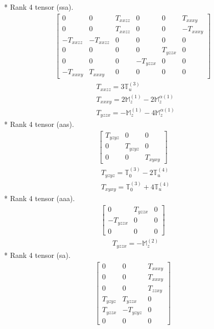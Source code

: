 \documentclass[fleqn,8pt,landscape]{jsarticle}
\begin{document}
* Rank 4 tensor (ssa).
\begin{align*}
\begin{bmatrix} 0 & 0 & T_{xxzz} & 0 & 0 & T_{xxxy} \\ 0 & 0 & T_{xxzz} & 0 & 0 & - T_{xxxy} \\ - T_{xxzz} & - T_{xxzz} & 0 & 0 & 0 & 0 \\ 0 & 0 & 0 & 0 & T_{yzzx} & 0 \\ 0 & 0 & 0 & - T_{yzzx} & 0 & 0 \\ - T_{xxxy} & T_{xxxy} & 0 & 0 & 0 & 0 \end{bmatrix}
\end{align*}
\begin{align*}
& T_{xxzz} = 3 \mathbb{T}_{u}^{(3)} \\
& T_{xxxy} = 2 \mathbb{M}_{z}^{(1)} - 2 \mathbb{M}_{z}^{\alpha(1)} \\
& T_{yzzx} = - \mathbb{M}_{z}^{(1)} - 4 \mathbb{M}_{z}^{\alpha(1)}
\end{align*}
* Rank 4 tensor (aas).
\begin{align*}
\begin{bmatrix} T_{yzyz} & 0 & 0 \\ 0 & T_{yzyz} & 0 \\ 0 & 0 & T_{xyxy} \end{bmatrix}
\end{align*}
\begin{align*}
& T_{yzyz} = \mathbb{T}_{0}^{(3)} - 2 \mathbb{T}_{u}^{(4)} \\
& T_{xyxy} = \mathbb{T}_{0}^{(3)} + 4 \mathbb{T}_{u}^{(4)}
\end{align*}
* Rank 4 tensor (aaa).
\begin{align*}
\begin{bmatrix} 0 & T_{yzzx} & 0 \\ - T_{yzzx} & 0 & 0 \\ 0 & 0 & 0 \end{bmatrix}
\end{align*}
\begin{align*}
& T_{yzzx} = - \mathbb{M}_{z}^{(2)}
\end{align*}
* Rank 4 tensor (sa).
\begin{align*}
\begin{bmatrix} 0 & 0 & T_{xxxy} \\ 0 & 0 & T_{xxxy} \\ 0 & 0 & T_{zzxy} \\ T_{yzyz} & T_{yzzx} & 0 \\ T_{yzzx} & - T_{yzyz} & 0 \\ 0 & 0 & 0 \end{bmatrix}
\end{align*}
\end{document}
